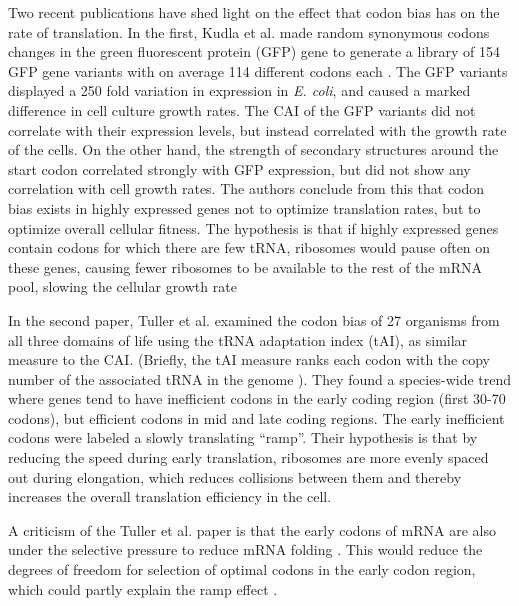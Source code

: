 Two recent publications have shed light on the effect that codon bias has on
the rate of translation. In the first, Kudla et al. made random synonymous
codons changes in the green fluorescent protein (GFP) gene to generate a
library of 154 GFP gene variants with on average 114 different codons each
\cite{kudla_coding-sequence_2009}. The GFP variants displayed a 250 fold
variation in expression in \textit{E. coli}, and caused a marked difference in
cell culture growth rates. The CAI of the GFP variants did not correlate with
their expression levels, but instead correlated with the growth rate of the
cells. On the other hand, the strength of secondary structures around the start
codon correlated strongly with GFP expression, but did not show any correlation
with cell growth rates. The authors conclude from this that codon bias exists
in highly expressed genes not to optimize translation rates, but to optimize
overall cellular fitness. The hypothesis is that if highly expressed genes
contain codons for which there are few tRNA, ribosomes would pause often on
these genes, causing fewer ribosomes to be available to the rest of the mRNA
pool, slowing the cellular growth rate \cite{kudla_coding-sequence_2009}

In the second paper, Tuller et al. \cite{tuller_evolutionarily_2010} examined
the codon bias of 27 organisms from all three domains of life using the tRNA
adaptation index (tAI), as similar measure to the CAI. (Briefly, the tAI
measure ranks each codon with the copy number of the associated tRNA in the
genome \cite{tuller_evolutionarily_2010}). They found a species-wide trend
where genes tend to have inefficient codons in the early coding region (first
30-70 codons), but efficient codons in mid and late coding regions. The early
inefficient codons were labeled a slowly translating ``ramp''. Their hypothesis
is that by reducing the speed during early translation, ribosomes are more
evenly spaced out during elongation, which reduces collisions between them and
thereby increases the overall translation efficiency in the cell.

A criticism of the Tuller et al. paper is that the early codons of mRNA are
also under the selective pressure to reduce mRNA folding
\cite{gu_universal_2010}. This would reduce the degrees of freedom for
selection of optimal codons in the early codon region, which could partly
explain the ramp effect \cite{plotkin_synonymous_2011}.

